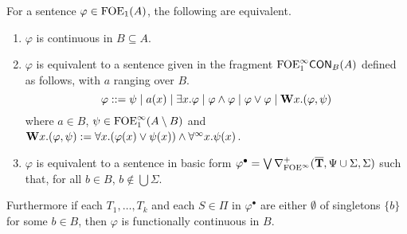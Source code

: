 \begin{theorem}\label{cor:ofoeicontinuousnf} For a sentence $\varphi \in \ofoe(A)$, the following are equivalent.
\begin{enumerate}
\item $\varphi$ is continuous in $B \subseteq A$.
\item $\varphi$ is equivalent to a sentence given in the fragment $\cont{\ofoei}{B}(A)$ defined as follows, with $a$ ranging over $B$.
\[
\varphi ::= \psi \mid a(x) \mid \exists x.\varphi \mid \varphi \land \varphi \mid \varphi \lor \varphi \mid \wqu x.(\varphi,\psi)
\]
where $a\in B$, $\psi \in \ofoei(A\setminus B)$ and $\wqu x.(\varphi,\psi) \df \forall x.(\varphi(x) \lor \psi(x)) \land \dqu x.\psi(x)$.
\item $\varphi$ is equivalent to a sentence in basic form $\varphi^{\bullet} = \bigvee \mondbnfofoei{\vlist{T}}{\Psi \cup \Sigma}{\Sigma}{+}$ such that, for all $b \in B$, $b\notin \bigcup\Sigma$.
\end{enumerate}
Furthermore if each $T_1, \dots, T_k$ and each $S \in \Pi$ in $\varphi^{\bullet}$ are either $\emptyset$ of singletons $\{b\}$ for some $b \in B$, then $\varphi$ is functionally continuous in $B$.
\end{theorem}
